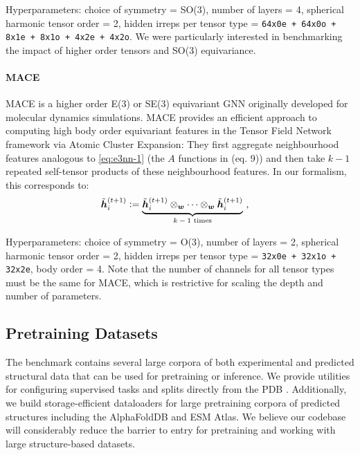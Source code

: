 Hyperparameters: choice of symmetry = SO(3), number of layers = 4, spherical harmonic tensor order = 2, hidden irreps per tensor type = \texttt{64x0e + 64x0o + 8x1e + 8x1o + 4x2e + 4x2o}.
We were particularly interested in benchmarking the impact of higher order tensors and SO(3) equivariance.

\paragraph{MACE}
MACE \citep{batatia2022mace} is a higher order E(3) or SE(3) equivariant GNN originally developed for molecular dynamics simulations.
MACE provides an efficient approach to computing high body order equivariant features in the Tensor Field Network framework via Atomic Cluster Expansion:
They first aggregate neighbourhood features analogous to \eqref{eq:e3nn-1} (the $A$ functions in \citet{batatia2022mace} (eq. 9)) and then take $k-1$ repeated self-tensor products of these neighbourhood features. 
In our formalism, this corresponds to:
\begin{align}
\label{eq:e3nn-3}
    \tilde {{\bm{h}}}_{i}^{(t+1)} & \vcentcolon= \underbrace {\tilde {{\bm{h}}}_{i}^{(t+1)} \otimes_{{\bm{w}}} \dots \otimes_{{\bm{w}}} \tilde {{\bm{h}}}_{i}^{(t+1)} }_\text{$k-1$ times} \ ,
\end{align}

Hyperparameters: choice of symmetry = O(3), number of layers = 2, spherical harmonic tensor order = 2, hidden irreps per tensor type = \texttt{32x0e + 32x1o + 32x2e}, body order = 4.
Note that the number of channels for all tensor types must be the same for MACE, which is restrictive for scaling the depth and number of parameters.


\subsection{Pretraining Datasets}
\label{app:pretrain-data}

The benchmark contains several large corpora of both experimental and predicted structural data that can be used for pretraining or inference. We provide utilities for configuring supervised tasks and splits directly from the PDB \citep{Berman2000}.
Additionally, we build storage-efficient dataloaders for large pretraining corpora of predicted structures including the AlphaFoldDB and ESM Atlas.
We believe our codebase will considerably reduce the barrier to entry for pretraining and working with large structure-based datasets. 

